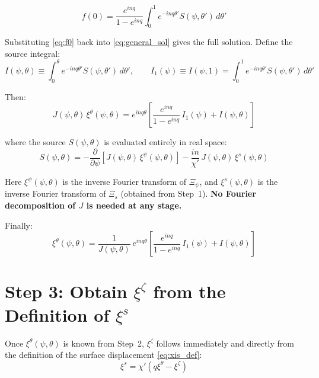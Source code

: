 \documentclass[12pt,a4paper]{article}
\begin{document}
\begin{equation}
    \boxed{f(0) = \frac{e^{inq}}{1 - e^{inq}}\int_0^1 e^{-inq\theta'} S(\psi,\theta')\,d\theta'}
    \label{eq:f0}
\end{equation}

Substituting \eqref{eq:f0} back into \eqref{eq:general_sol} gives the full solution. Define the source integral:
\begin{equation}
    I(\psi,\theta) \equiv \int_0^\theta e^{-inq\theta'} S(\psi,\theta')\,d\theta', \qquad I_1(\psi) \equiv I(\psi, 1) = \int_0^1 e^{-inq\theta'} S(\psi,\theta')\,d\theta'
\end{equation}

Then:
\begin{equation}
    \boxed{
    J(\psi,\theta)\,\xi^\theta(\psi,\theta) = e^{inq\theta}\left[\frac{e^{inq}}{1-e^{inq}}\,I_1(\psi) + I(\psi,\theta)\right]
    }
    \label{eq:xitheta_real}
\end{equation}

where the source $S(\psi,\theta)$ is evaluated entirely in real space:
\begin{equation}
    S(\psi,\theta) = -\frac{\partial}{\partial\psi}\!\left[J(\psi,\theta)\,\xi^\psi(\psi,\theta)\right] - \frac{in}{\chi'}\,J(\psi,\theta)\,\xi^s(\psi,\theta)
    \label{eq:source_real}
\end{equation}

Here $\xi^\psi(\psi,\theta)$ is the inverse Fourier transform of $\Xi_\psi$, and $\xi^s(\psi,\theta)$ is the inverse Fourier transform of $\Xi_s$ (obtained from Step~1). \textbf{No Fourier decomposition of $J$ is needed at any stage.}

Finally:
\begin{equation}
    \boxed{\xi^\theta(\psi,\theta) = \frac{1}{J(\psi,\theta)}\,e^{inq\theta}\left[\frac{e^{inq}}{1-e^{inq}}\,I_1(\psi) + I(\psi,\theta)\right]}
    \label{eq:xitheta_final}
\end{equation}

\section{Step 3: Obtain $\xi^\zeta$ from the Definition of $\xi^s$}

Once $\xi^\theta(\psi,\theta)$ is known from Step~2, $\xi^\zeta$ follows immediately and directly from the definition of the surface displacement \eqref{eq:xis_def}:
\begin{equation}
    \xi^s = \chi'(q\xi^\theta - \xi^\zeta)
\end{equation}
\end{document}
